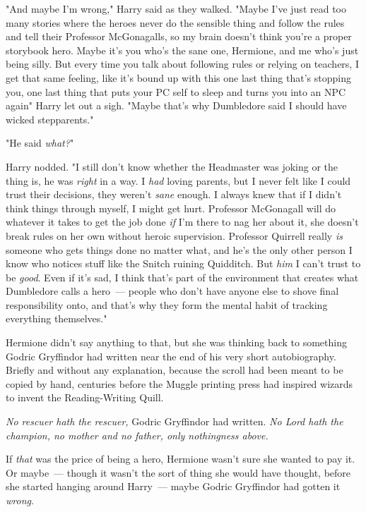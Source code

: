"And maybe I'm wrong," Harry said as they walked. "Maybe I've just read too
many stories where the heroes never do the sensible thing and follow the rules
and tell their Professor McGonagalls, so my brain doesn't think you're a proper
storybook hero. Maybe it's you who's the sane one, Hermione, and me who's just
being silly. But every time you talk about following rules or relying on
teachers, I get that same feeling, like it's bound up with this one last thing
that's stopping you, one last thing that puts your PC self to sleep and turns
you into an NPC again{\el}" Harry let out a sigh. "Maybe that's why
Dumbledore said I should have wicked stepparents."

"He said \emph{what?}"

Harry nodded. "I still don't know whether the Headmaster was joking or{\el}
the thing is, he was \emph{right} in a way. I \emph{had} loving parents, but I
never felt like I could trust their decisions, they weren't \emph{sane} enough.
I always knew that if I didn't think things through myself, I might get hurt.
Professor McGonagall will do whatever it takes to get the job done \emph{if}
I'm there to nag her about it, she doesn't break rules on her own without
heroic supervision. Professor Quirrell really \emph{is} someone who gets things
done no matter what, and he's the only other person I know who notices stuff
like the Snitch ruining Quidditch. But \emph{him} I can't trust to be
\emph{good}. Even if it's sad, I think that's part of the environment that
creates what Dumbledore calls a hero~--- people who don't have anyone else to
shove final responsibility onto, and that's why they form the mental habit of
tracking everything themselves."

Hermione didn't say anything to that, but she was thinking back to something
Godric Gryffindor had written near the end of his very short autobiography.
Briefly and without any explanation, because the scroll had been meant to be
copied by hand, centuries before the Muggle printing press had inspired wizards
to invent the Reading-Writing Quill.

\emph{No rescuer hath the rescuer,} Godric Gryffindor had written. \emph{No
Lord hath the champion, no mother and no father, only nothingness above.}

If \emph{that} was the price of being a hero, Hermione wasn't sure she wanted
to pay it. Or maybe~--- though it wasn't the sort of thing she would have
thought, before she started hanging around Harry~--- maybe Godric Gryffindor had
gotten it \emph{wrong}.

